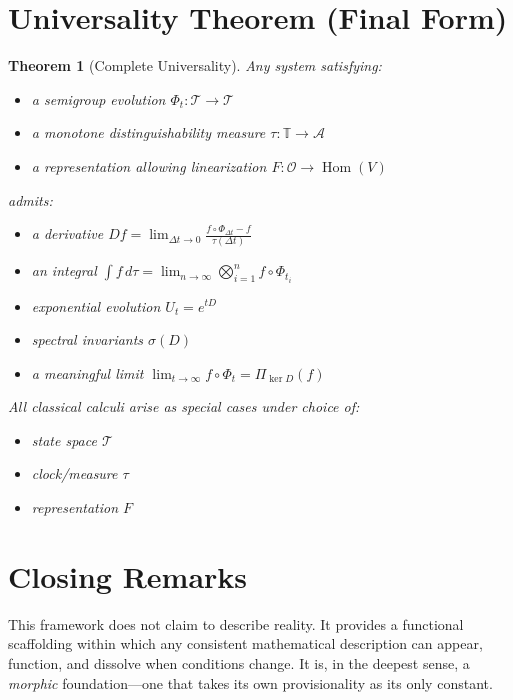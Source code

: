 \documentclass[12pt, oneside]{article}
\newtheorem{theorem}{Theorem}[section]
\DeclareMathOperator{\Hom}{Hom}
\newcommand{\A}{\mathcal{A}}
\newcommand{\T}{\mathcal{T}}
\newcommand{\Opr}{\mathcal{O}}
\begin{document}
\section{Universality Theorem (Final Form)}

\begin{theorem}[Complete Universality]
Any system satisfying:
\begin{itemize}
    \item a semigroup evolution $\Phi_t: \T \rightarrow \T$
    \item a monotone distinguishability measure $\tau: \mathbb{T} \rightarrow \A$
    \item a representation allowing linearization $F: \Opr \rightarrow \Hom(V)$
\end{itemize}
admits:
\begin{itemize}
    \item a derivative $Df = \lim_{\Delta t \to 0} \frac{f \circ \Phi_{\Delta t} - f}{\tau(\Delta t)}$
    \item an integral $\int f \, d\tau = \lim_{n \to \infty} \bigotimes_{i=1}^n f \circ \Phi_{t_i}$
    \item exponential evolution $U_t = e^{tD}$
    \item spectral invariants $\sigma(D)$
    \item a meaningful limit $\lim_{t \to \infty} f \circ \Phi_t = \Pi_{\ker D}(f)$
\end{itemize}
All classical calculi arise as special cases under choice of:
\begin{itemize}
    \item state space $\T$
    \item clock/measure $\tau$
    \item representation $F$
\end{itemize}
\end{theorem}

\section{Closing Remarks}

This framework does not claim to describe reality. It provides a functional scaffolding within which any consistent mathematical description can appear, function, and dissolve when conditions change. It is, in the deepest sense, a \textit{morphic} foundation—one that takes its own provisionality as its only constant.

\begin{center}
\end{center}
\end{document}
